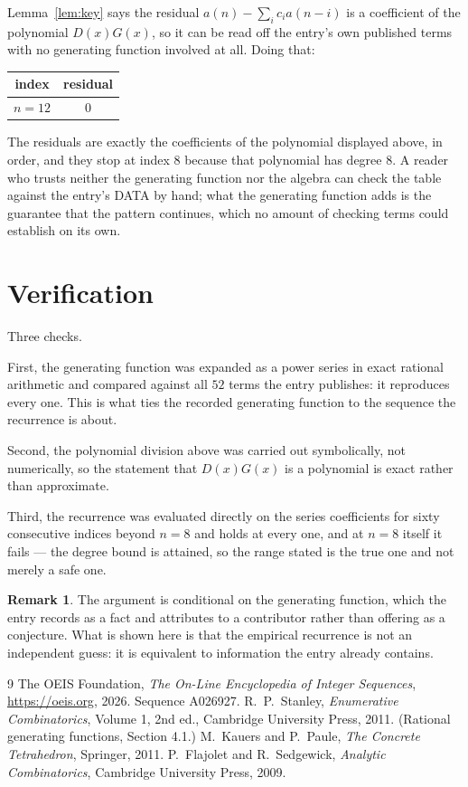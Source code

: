 \documentclass[11pt,a4paper]{article}
\theoremstyle{plain}
\theoremstyle{definition}
\newtheorem{remark}[theorem]{Remark}
\begin{document}
Lemma~\ref{lem:key} says the residual $a(n)-\sum_ic_ia(n-i)$ is a coefficient of the
polynomial $D(x)G(x)$, so it can be read off the entry's own published terms with no
generating function involved at all. Doing that:
\begin{center}
\begin{tabular}{cc}
index & residual \\ \hline
$n=12$ & $0$
\end{tabular}
\end{center}
The residuals are exactly the coefficients of the polynomial displayed above, in order, and
they stop at index $8$ because that polynomial has degree $8$. A reader who trusts
neither the generating function nor the algebra can check the table against the entry's DATA
by hand; what the generating function adds is the guarantee that the pattern continues, which
no amount of checking terms could establish on its own.

\section{Verification}

Three checks.

First, the generating function was expanded as a power series in exact rational arithmetic and
compared against all $52$ terms the entry publishes: it reproduces every one. This is
what ties the recorded generating function to the sequence the recurrence is about.

Second, the polynomial division above was carried out symbolically, not numerically, so the
statement that $D(x)G(x)$ is a polynomial is exact rather than approximate.

Third, the recurrence was evaluated directly on the series coefficients for sixty consecutive
indices beyond $n=8$ and holds at every one, and at $n=8$ itself it fails --- the
degree bound is attained, so the range stated is the true one and not merely a safe one.

\begin{remark}
The argument is conditional on the generating function, which the entry records as a fact and
attributes to a contributor rather than offering as a conjecture. What is shown here is that
the empirical recurrence is not an independent guess: it is equivalent to information the
entry already contains.
\end{remark}

\begin{thebibliography}{9}
 The OEIS Foundation, \emph{The On-Line Encyclopedia of Integer
Sequences}, \url{https://oeis.org}, 2026. Sequence A026927.
 R.~P.~Stanley, \emph{Enumerative Combinatorics}, Volume 1, 2nd ed.,
Cambridge University Press, 2011. (Rational generating functions, Section 4.1.)
 M.~Kauers and P.~Paule, \emph{The Concrete Tetrahedron}, Springer, 2011.
 P.~Flajolet and R.~Sedgewick, \emph{Analytic Combinatorics}, Cambridge
University Press, 2009.
\end{thebibliography}
\end{document}

